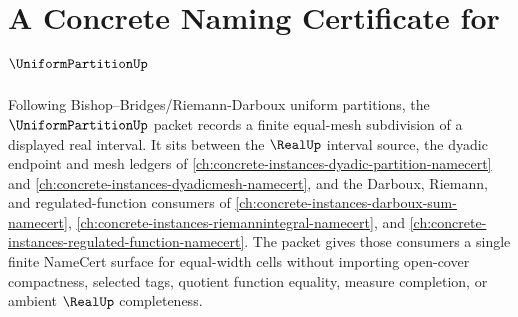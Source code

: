 \chapter{A Concrete Naming Certificate for $\UniformPartitionUp$}
\label{ch:concrete-instances-uniform-partition-namecert}

Following Bishop--Bridges/Riemann-Darboux uniform partitions, the $\UniformPartitionUp$ packet records a finite equal-mesh subdivision of a displayed real interval. It sits between the $\RealUp$ interval source, the dyadic endpoint and mesh ledgers of \autoref{ch:concrete-instances-dyadic-partition-namecert} and \autoref{ch:concrete-instances-dyadicmesh-namecert}, and the Darboux, Riemann, and regulated-function consumers of \autoref{ch:concrete-instances-darboux-sum-namecert}, \autoref{ch:concrete-instances-riemannintegral-namecert}, and \autoref{ch:concrete-instances-regulated-function-namecert}. The packet gives those consumers a single finite NameCert surface for equal-width cells without importing open-cover compactness, selected tags, quotient function equality, measure completion, or ambient $\RealUp$ completeness.

